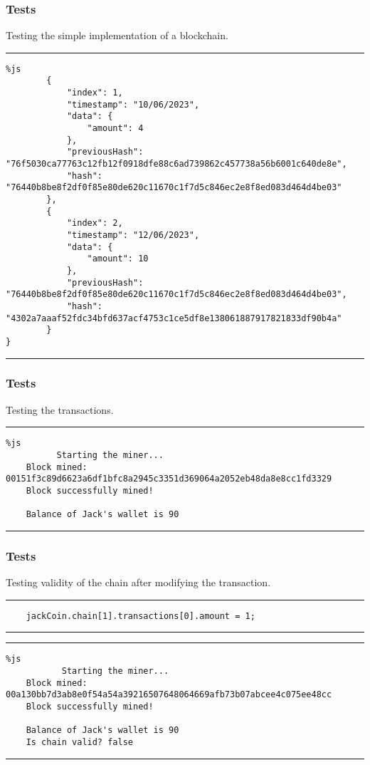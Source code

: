 \documentclass[14pt, aspectratio=169]{beamer}
\begin{document}
\begin{frame}[fragile]
\frametitle{Tests}
Testing the simple implementation of a blockchain.
\scriptsize
\rule{\textwidth}{1pt}
\begin{verbatim}%js
        {
            "index": 1,
            "timestamp": "10/06/2023",
            "data": {
                "amount": 4
            },
            "previousHash": "76f5030ca77763c12fb12f0918dfe88c6ad739862c457738a56b6001c640de8e",
            "hash": "76440b8be8f2df0f85e80de620c11670c1f7d5c846ec2e8f8ed083d464d4be03"
        },
        {
            "index": 2,
            "timestamp": "12/06/2023",
            "data": {
                "amount": 10
            },
            "previousHash": "76440b8be8f2df0f85e80de620c11670c1f7d5c846ec2e8f8ed083d464d4be03",
            "hash": "4302a7aaaf52fdc34bfd637acf4753c1ce5df8e138061887917821833df90b4a"
        }
}
\end{verbatim}
\rule{\textwidth}{1pt}
\end{frame}
\begin{frame}[fragile]
\frametitle{Tests}
Testing the transactions.
\scriptsize
\rule{\textwidth}{1pt}
\begin{verbatim}%js
          Starting the miner...
    Block mined: 00151f3c89d6623a6df1bfc8a2945c3351d369064a2052eb48da8e8cc1fd3329
    Block successfully mined!

    Balance of Jack's wallet is 90
\end{verbatim}
\rule{\textwidth}{1pt}
\end{frame}
\begin{frame}[fragile]
\frametitle{Tests}
Testing validity of the chain after modifying the transaction.
\scriptsize
\rule{\textwidth}{1pt}
\begin{verbatim}
    jackCoin.chain[1].transactions[0].amount = 1;
\end{verbatim}
\rule{\textwidth}{1pt}
\rule{\textwidth}{1pt}
\begin{verbatim}%js
           Starting the miner...
    Block mined: 00a130bb7d3ab8e0f54a54a39216507648064669afb73b07abcee4c075ee48cc
    Block successfully mined!

    Balance of Jack's wallet is 90
    Is chain valid? false
\end{verbatim}
\rule{\textwidth}{1pt}
\end{frame}
\end{document}
